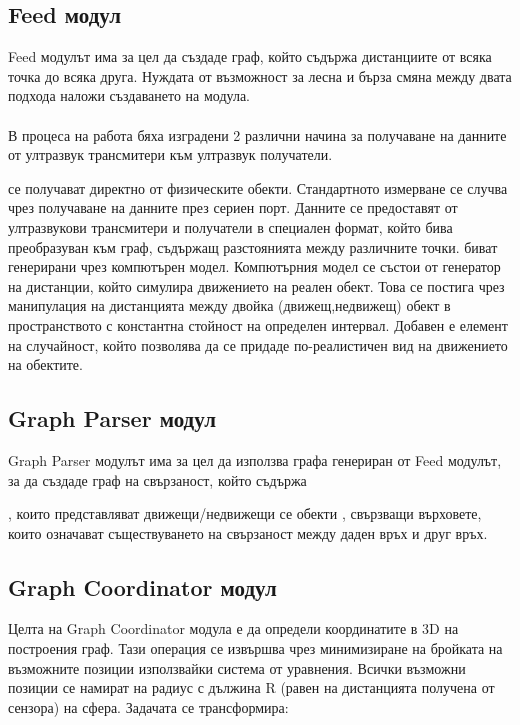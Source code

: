 \pagebreak

\subsection{Feed модул}
Feed модулът има за цел да създаде граф, който съдържа дистанциите от всяка точка до всяка друга. Нуждата от възможност за лесна и бърза смяна между двата подхода наложи създаването на модула.\\\\
В процеса на работа бяха изградени 2 различни начина за получаване на данните от ултразвук трансмитери към ултразвук получатели. 
\begin{enumerate}
     се получават директно от физическите обекти. Стандартното измерване се случва чрез получаване на данните през сериен порт. Данните се предоставят от ултразвукови трансмитери и получатели в специален формат, който бива преобразуван към граф, съдържащ разстоянията между различните точки.
     биват генерирани чрез компютърен модел. Компютърния модел се състои от генератор на дистанции, който симулира движението на реален обект. Това се постига чрез манипулация на дистанцията между двойка (движещ,недвижещ) обект в пространството с константна стойност на определен интервал. Добавен е елемент на случайност, който позволява да се придаде по-реалистичен вид на движението на обектите.
\end{enumerate}

\pagebreak

\subsection{Graph Parser модул}
Graph Parser модулът има за цел да използва графа генериран от Feed модулът, за да създаде граф на свързаност, който съдържа
\begin{enumerate}
, които представляват движещи/недвижещи се обекти 
, свързващи върховете, които означават съществуването на свързаност между
даден връх и друг връх.
\end{enumerate}

\pagebreak

\subsection{Graph Coordinator модул}
Целта на Graph Coordinator модула е да определи координатите в 3D на построения граф. Тази операция се извършва чрез минимизиране на бройката на възможните позиции използвайки система от уравнения. Всички възможни позиции се намират на радиус с дължина R (равен на дистанцията получена от сензора) на сфера. Задачата се трансформира:\\

